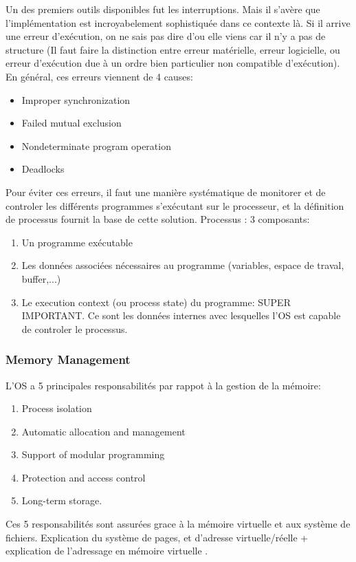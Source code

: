 Un des premiers outils disponibles fut les interruptions.
Mais il s'avère que l'implémentation est incroyabelement sophistiquée dans ce contexte là.
Si il arrive une erreur d'exécution, on ne sais pas dire d'ou elle viens car il n'y a pas de structure (Il faut faire la distinction entre erreur matérielle, erreur logicielle, ou erreur d'exécution due à un ordre bien particulier non compatible d'exécution).
En général, ces erreurs viennent de 4 causes:
\begin{itemize}
  \item Improper synchronization
  \item Failed mutual exclusion
  \item Nondeterminate program operation
  \item Deadlocks
\end{itemize}

Pour éviter ces erreurs, il faut une manière systématique de monitorer et de controler les différents programmes s'exécutant sur le processeur, et la définition de processus fournit la base de cette solution.
Processus : 3 composants:
\begin{enumerate}
  \item Un programme exécutable
  \item Les données associées nécessaires au programme (variables, espace de traval, buffer,...)
  \item Le execution context (ou process state) du programme: SUPER IMPORTANT.
    Ce sont les données internes avec lesquelles l'OS est capable de controler le processus.
\end{enumerate}


\subsubsection{Memory Management}
L'OS a 5 principales responsabilités par rappot à la gestion de la mémoire:
\begin{enumerate}
  \item Process isolation
  \item Automatic allocation and management
  \item Support of modular programming
  \item Protection and access control
  \item Long-term storage.
\end{enumerate}
Ces 5 responsabilités sont assurées grace à la mémoire virtuelle et aux système de fichiers.
Explication du système de pages, et d'adresse virtuelle/réelle \cite[p.~87]{stallings} +
explication de l'adressage en mémoire virtuelle \cite[p.~88]{stallings}.

